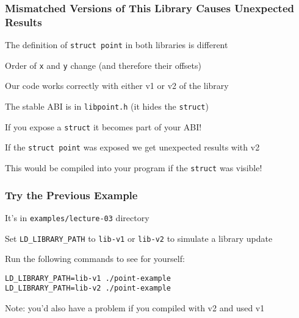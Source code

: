   \begin{frame}[fragile]
    \frametitle{Mismatched Versions of This Library Causes Unexpected Results}

    The definition of \texttt{struct point} in both libraries is different

    \hspace{2em} Order of \texttt{x} and \texttt{y} change (and therefore their offsets)

    \vspace{2em}

    Our code works correctly with either v1 or v2 of the library

    \hspace{2em} The stable ABI is in \lstinline|libpoint.h| (it hides the \texttt{struct})

    \hspace{4em} If you expose a \texttt{struct} it becomes part of your ABI!

    \vspace{2em}

    If the \texttt{struct point} was exposed we get unexpected results with v2

    \hspace{2em} This would be compiled into your program if the \texttt{struct}
    was visible!
  \end{frame}

  \begin{frame}[fragile]
    \frametitle{Try the Previous Example}

    It's in \lstinline|examples/lecture-03| directory

    \vspace{2em}

    Set \texttt{LD\_LIBRARY\_PATH} to \lstinline|lib-v1| or \lstinline|lib-v2|
    to  simulate a library update

    \vspace{2em}

    Run the following commands to see for yourself:
    \begin{lstlisting}[commentstyle={}, xleftmargin=2em]
LD_LIBRARY_PATH=lib-v1 ./point-example
LD_LIBRARY_PATH=lib-v2 ./point-example
    \end{lstlisting}

    \vspace{2em}

    Note: you'd also have a problem if you compiled with v2 and used v1
  \end{frame}

